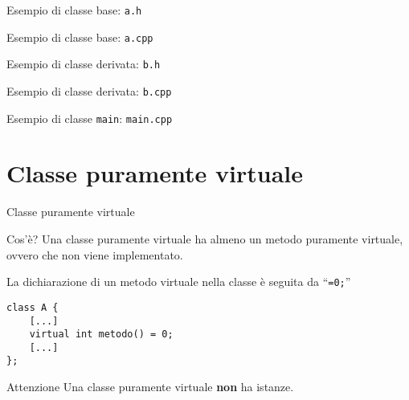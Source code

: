 \documentclass[xcolor={dvipsnames, svgnames, x11names, table}, 10pt]{beamer}
\begin{document}
\begin{frame}[fragile]{Esempio di \alert{classe base}: \texttt{a.h}}


\end{frame}

\begin{frame}[fragile]{Esempio di \alert{classe base}: \texttt{a.cpp}}


\end{frame}

\begin{frame}[fragile]{Esempio di \alert{classe derivata}: \texttt{b.h}}


\end{frame}

\begin{frame}[fragile]{Esempio di \alert{classe derivata}: \texttt{b.cpp}}


\end{frame}

\begin{frame}{Esempio di classe \alert{\texttt{main}}: \texttt{main.cpp}}
    
    
\end{frame}

\section{Classe puramente virtuale}

\begin{frame}[fragile]{Classe puramente virtuale}

\begin{block}{Cos'è?}
    Una classe puramente virtuale ha almeno un metodo puramente virtuale, ovvero che non viene implementato.
\end{block}

La dichiarazione di un metodo virtuale nella classe è seguita da \enquote{\texttt{=0;}}

\begin{verbatim}
class A {
    [...]
    virtual int metodo() = 0;
    [...]
};
\end{verbatim}
    
\begin{alertblock}{Attenzione}
Una classe puramente virtuale \textbf{non} ha istanze.
\end{alertblock}

\end{frame}
\end{document}
